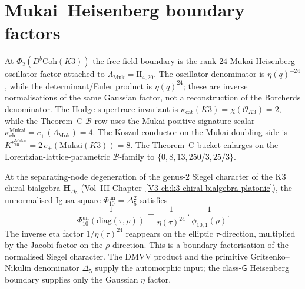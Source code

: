 \section{Mukai--Heisenberg boundary factors}
\label{sec:ff-supplement}

\begin{remark}
\label{rem:ff-mukai-heisenberg}
At $\Phi_2(D^b\mathrm{Coh}(K3))$ the free-field boundary is the
rank-$24$ Mukai-Heisenberg oscillator factor attached to
$\Lambda_{\mathrm{Muk}}=\mathrm{II}_{4,20}$. The oscillator
denominator is $\eta(q)^{-24}$, while the determinant/Euler product is
$\eta(q)^{24}$; these are inverse normalisations of the same Gaussian
factor, not a reconstruction of the Borcherds denominator. The
Hodge-supertrace invariant is
$\kappa_{\mathrm{cat}}(K3)=\chi(\mathcal{O}_{K3})=2$, while the
Theorem~C $\mathcal{B}$-row uses the Mukai positive-signature scalar
$\kappa_{\mathrm{ch}}^{\mathrm{Mukai}}=c_+(\Lambda_{\mathrm{Muk}})=4$.
The Koszul conductor on the Mukai-doubling side is
$K^{\kappa_{\mathrm{ch}}^{\mathrm{Mukai}}}
=2\,c_+(\mathrm{Mukai}(K3))=8$. The Theorem~C bucket enlarges on the
Lorentzian-lattice-parametric $\mathcal{B}$-family to
$\{0, 8, 13, 250/3, 25/3\}$.
\end{remark}

\begin{remark}
\label{rem:ff-genus2-factorisation}
At the separating-node degeneration of the genus-$2$ Siegel character
of the K3 chiral bialgebra $\mathbf H_{\Delta_5}$ (Vol~III
Chapter~\ref{V3-ch:k3-chiral-bialgebra-platonic}), the unnormalised
Igusa square $\Phi_{10}^{\mathrm{un}}=\Delta_5^2$ satisfies
\[
\frac{1}{\Phi_{10}^{\mathrm{un}}(\mathrm{diag}(\tau,\rho))}
=
\frac{1}{\eta(\tau)^{24}}\cdot\frac{1}{\phi_{10,1}(\rho)}.
\]
The inverse eta factor $1/\eta(\tau)^{24}$ reappears on the elliptic
$\tau$-direction, multiplied by the Jacobi factor on the
$\rho$-direction. This is a boundary factorisation of the
normalised Siegel character. The DMVV product and the primitive
Gritsenko--Nikulin denominator $\Delta_5$ supply the automorphic
input; the class-$\mathsf G$ Heisenberg boundary supplies only the
Gaussian $\eta$ factor.
\end{remark}

